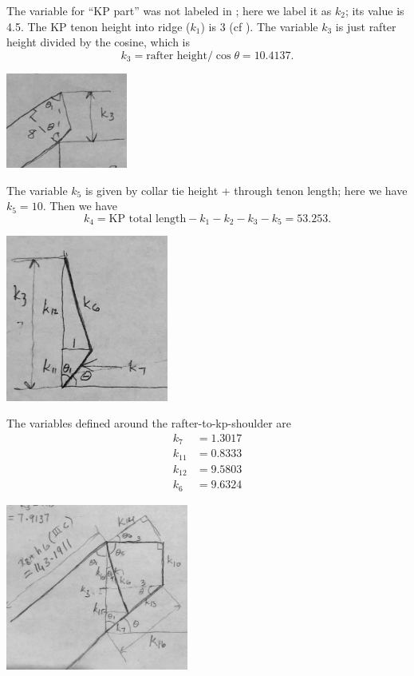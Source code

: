 \documentclass{article}\usepackage[]{graphicx}\usepackage[]{xcolor}
\begin{document}
The variable for ``KP part'' was not labeled in ; here we label it as $k_2$; its value is 4.5. The KP tenon height into ridge ($k_1$) is 3 (cf ). The variable $k_3$ is just rafter height divided by the cosine, which is 
\[ k_3 = \text{rafter height}/\cos\theta = 10.4137.   \]

\begin{center}
	\includegraphics[width=0.3\textwidth]{images/k3}
\end{center}

The variable $k_5$ is given by collar tie height + through tenon length; here we have $k_5 = 10$. Then we have 
\[ k_4 = \text{KP total length} - k_1 - k_2 - k_3 - k_5 = 53.253. \]


\begin{center}
	\includegraphics[width=0.4\textwidth]{images/kp_shoulder_angles}
\end{center}


The variables defined around the rafter-to-kp-shoulder are 
\begin{align*}
k_7 &= 1.3017\\
k_{11} &= 0.8333\\
k_{12} &= 9.5803\\
k_6 &= 9.6324
\end{align*}

\begin{center}
	\includegraphics[width=0.45\textwidth]{images/rafter_tenon_detail}
\end{center}
\end{document}
